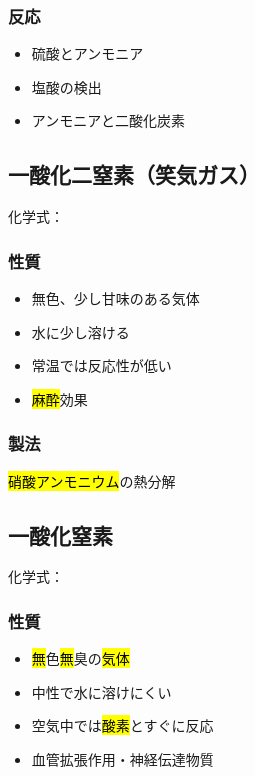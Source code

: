 \subsubsection{反応}
\begin{itemize}
      \item 硫酸とアンモニア\\
      \item 塩酸の検出\\
      \item アンモニアと二酸化炭素\\
\end{itemize}
\newpage
\subsection{一酸化二窒素（笑気ガス）}
化学式：\hl{}
\subsubsection{性質}
\begin{itemize}
      \item 無色、少し甘味のある気体
      \item 水に少し溶ける
      \item 常温では反応性が低い
      \item \hl{麻酔}効果
\end{itemize}
\subsubsection{製法}
\hl{硝酸アンモニウム}の熱分解\\
\subsection{一酸化窒素}
化学式：\hl{}
\subsubsection{性質}
\begin{itemize}
      \item \hl{無}色\hl{無}臭の\hl{気体}
      \item 中性で水に溶けにくい
      \item 空気中では\hl{酸素}とすぐに反応
      \item 血管拡張作用・神経伝達物質
\end{itemize}
